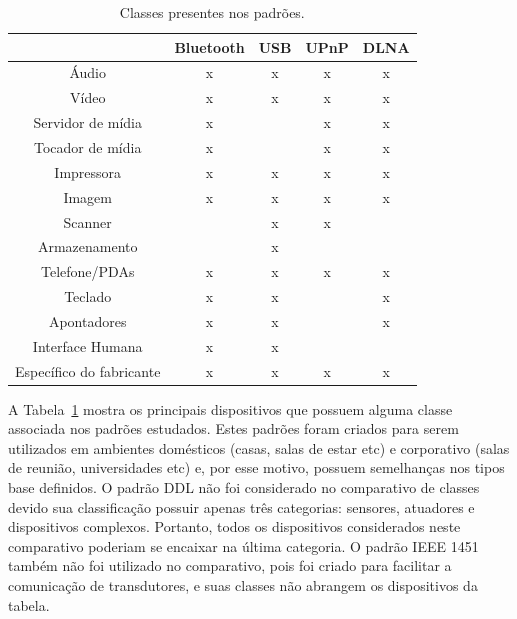 \begin{table}
	\caption{Classes presentes nos padrões.}
	\begin{center}
		\begin{tabular}{|ccccc|}
		\hline
									& \textbf{Bluetooth} 	& \textbf{USB}	& \textbf{UPnP} & \textbf{DLNA}	\\
		\hline
		Áudio						& x						& x				& x 			& x				\\
		\hline
		Vídeo						& x						& x				& x				& x				\\
		\hline
		Servidor de mídia			& x						&				& x 			& x				\\
		\hline
		Tocador de mídia			& x						&				& x				& x				\\
		\hline
		Impressora 					& x						& x				& x				& x				\\
		\hline
		Imagem	 					& x						& x				& x				& x				\\
		\hline
		Scanner						& 						& x				& x				& 				\\
		\hline
		Armazenamento				&						& x				& 				& 				\\	
		\hline
		Telefone/PDAs				& x						& x				& x				& x				\\
		\hline
		Teclado						& x						& x				& 				& x				\\
		\hline
		Apontadores					& x						& x				& 				& x 			\\
		\hline
		Interface Humana		 	& x						& x				&  				&  				\\
		\hline
		Específico do fabricante 	& x 					& x				& x				& x				\\
		\hline								
		\end{tabular}
	\end{center}
	\label{tab:comparativoClasses}
\end{table}

A Tabela~\ref{tab:comparativoClasses} mostra os principais dispositivos que possuem alguma classe associada nos padrões estudados. Estes padrões foram criados para serem utilizados em ambientes domésticos (casas, salas de estar etc) e corporativo (salas de reunião, universidades etc) e, por esse motivo, possuem semelhanças nos tipos base definidos. O padrão DDL não foi considerado no comparativo de classes devido sua classificação possuir apenas três categorias: sensores, atuadores e dispositivos complexos. Portanto, todos os dispositivos considerados neste comparativo poderiam se encaixar na última categoria. O padrão IEEE 1451 também não foi utilizado no comparativo, pois foi criado para facilitar a comunicação de transdutores, e suas classes não abrangem os dispositivos da tabela. 
